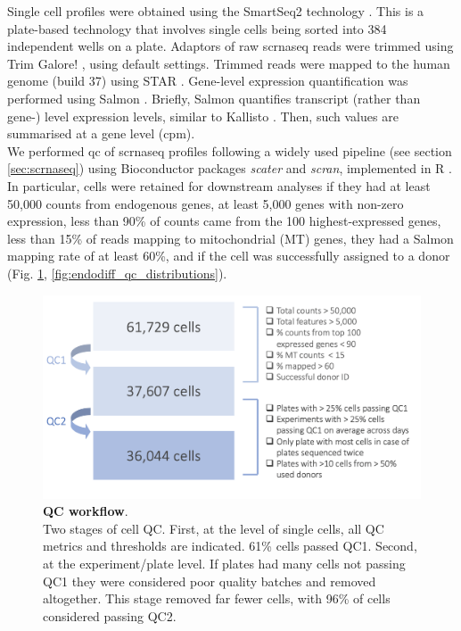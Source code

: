 Single cell profiles were obtained using the SmartSeq2 technology \cite{picelli2013smart}. 
This is a plate-based technology that involves single cells being sorted into 384 independent wells on a plate. 
Adaptors of raw \gls{scrnaseq} reads were trimmed using Trim Galore! \cite{galore2015wrapper, martin2011cutadapt, andrews2010fastqc}, using default settings. 
Trimmed reads were mapped to the human genome (build 37) using STAR \cite{dobin2013star}. 
Gene-level expression quantification was performed using Salmon \cite{patro2017salmon}. 
Briefly, Salmon quantifies transcript (rather than gene-) level expression levels, similar to Kallisto \cite{bray2016near}.
Then, such values are summarised at a gene level (\gls{cpm}).\\


We performed \gls{qc} of \gls{scrnaseq} profiles following a widely used pipeline (see section \ref{sec:scrnaseq}) using Bioconductor packages \textit{scater} and \textit{scran}, implemented in R \cite{lun2016step, mccarthy2017scater, lun2019singlecellexperiment}.  
In particular, cells were retained for downstream analyses if they had at least 50,000 counts from endogenous genes, at least 5,000 genes with non-zero expression, less than 90\% of counts came from the 100 highest-expressed genes, less than 15\% of reads mapping to mitochondrial (MT) genes, they had a Salmon mapping rate of at least 60\%, and if the cell was successfully assigned to a donor (Fig. \ref{fig:endodiff_qc_workflow}, \ref{fig:endodiff_qc_distributions}). 

\begin{figure}[h]
\centering
\includegraphics[width=16cm]{Chapter4/Fig/endodiff_qc_workflow.png}
\caption[QC workflow]{\textbf{QC workflow}.\\
Two stages of cell QC.
First, at the level of single cells, all QC metrics and thresholds are indicated.
61\% cells passed QC1.
Second, at the experiment/plate level.
If plates had many cells not passing QC1 they were considered poor quality batches and removed altogether.
This stage removed far fewer cells, with 96\% of cells considered passing QC2.}
\label{fig:endodiff_qc_workflow}
\end{figure}

